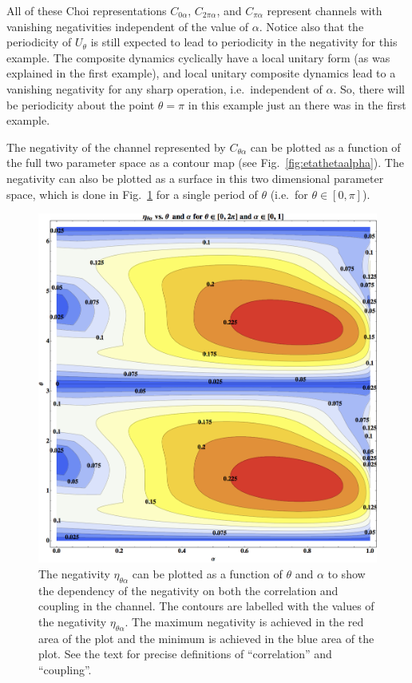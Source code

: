 All of these Choi representations $C_{0\alpha}$, $C_{2\pi\alpha}$, and $C_{\pi\alpha}$ represent channels with vanishing negativities independent of the value of $\alpha$.  Notice also that the periodicity of $U_\theta$ is still expected to lead to periodicity in the negativity for this example.  The composite dynamics cyclically have a local unitary form (as was explained in the first example), and local unitary composite dynamics lead to a vanishing negativity for any sharp operation, i.e.\ independent of $\alpha$.  So, there will be periodicity about the point $\theta=\pi$ in this example just an there was in the first example.

The negativity of the channel represented by $C_{\theta\alpha}$ can be plotted as a function of the full two parameter space as a contour map (see Fig.\ \ref{fig:etathetaalpha}).  The negativity can also be plotted as a surface in this two dimensional parameter space, which is done in Fig.\ \ref{fig:etathetaalphaAlso} for a single period of $\theta$ (i.e.\ for $\theta\in[0,\pi]$).
\begin{figure}[h!t]
\centering
\includegraphics[scale=0.36]{eatthetaalphaII.png}
\caption{The negativity $\eta_{\theta\alpha}$ can be plotted as a function of $\theta$ and $\alpha$ to show the dependency of the negativity on both the correlation and coupling in the channel.  The contours are labelled with the values of the negativity $\eta_{\theta\alpha}$.  The maximum negativity is achieved in the red area of the plot and the minimum is achieved in the blue area of the plot.  See the text for precise definitions of ``correlation'' and ``coupling''. }
\label{fig:etathetaalphaAlso}
\end{figure}
